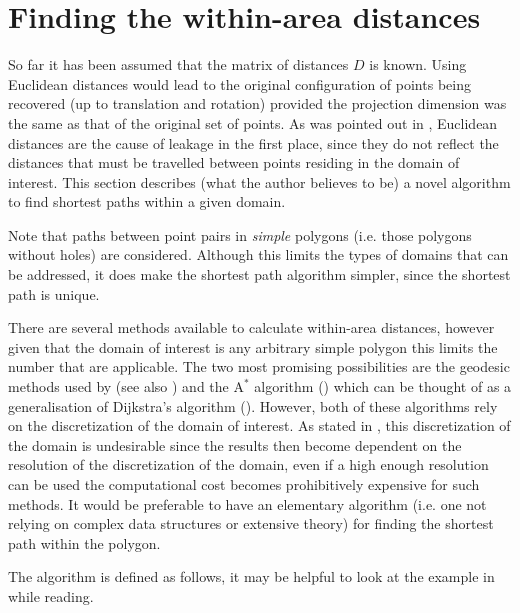\section{Finding the within-area distances}
\label{mdsdist}

So far it has been assumed that the matrix of distances $D$ is known. Using Euclidean distances would lead to the original configuration of points being recovered (up to translation and rotation) provided the projection dimension was the same as that of the original set of points. As was pointed out in , Euclidean distances are the cause of leakage in the first place, since they do not reflect the distances that must be travelled between points residing in the domain of interest. This section describes (what the author believes to be) a novel algorithm to find shortest paths within a given domain.

Note that paths between point pairs in \textit{simple} polygons (i.e. those polygons without holes) are considered. Although this limits the types of domains that can be addressed, it does make the shortest path algorithm simpler, since the shortest path is unique.

There are several methods available to calculate within-area distances, however given that the domain of interest is any arbitrary simple polygon this limits the number that are applicable. The two most promising possibilities are the geodesic methods used by  (see also ) and the $\text{A}^*$ algorithm (\cite{astarpaper}) which can be thought of as a generalisation of Dijkstra's algorithm (\cite{dijkstra}). However, both of these algorithms rely on the discretization of the domain of interest. As stated in , this discretization of the domain is undesirable since the results then become dependent on the resolution of the discretization of the domain, even if a high enough resolution can be used the computational cost becomes prohibitively expensive for such methods. It would be preferable to have an elementary algorithm (i.e. one not relying on complex data structures or extensive theory) for finding the shortest path within the polygon.

The algorithm is defined as follows, it may be helpful to look at the example in  while reading.

